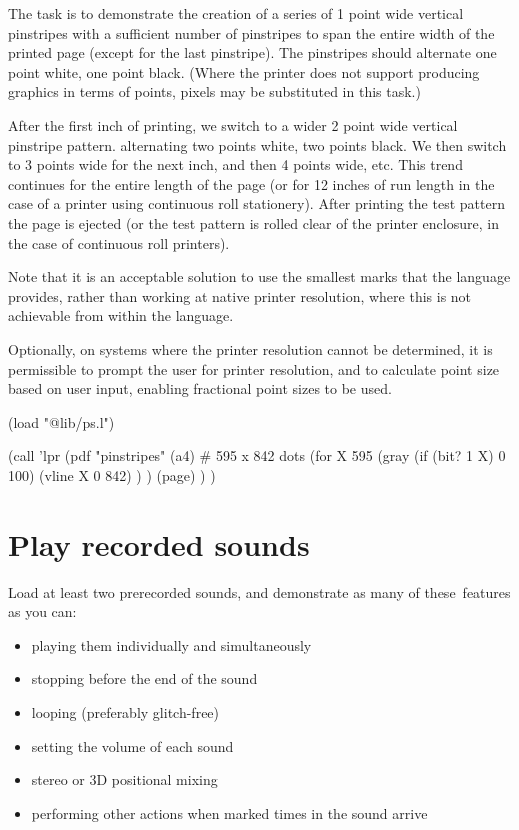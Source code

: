 The task is to demonstrate the creation of a series of 1 point wide
vertical pinstripes with a sufficient number of pinstripes to span the
entire width of the printed page (except for the last pinstripe). The
pinstripes should alternate one point white, one point black. (Where the
printer does not support producing graphics in terms of points, pixels
may be substituted in this task.)

After the first inch of printing, we switch to a wider 2 point wide
vertical pinstripe pattern. alternating two points white, two points
black. We then switch to 3 points wide for the next inch, and then 4
points wide, etc. This trend continues for the entire length of the page
(or for 12 inches of run length in the case of a printer using
continuous roll stationery). After printing the test pattern the page is
ejected (or the test pattern is rolled clear of the printer enclosure,
in the case of continuous roll printers).

Note that it is an acceptable solution to use the smallest marks that
the language provides, rather than working at native printer resolution,
where this is not achievable from within the language.

Optionally, on systems where the printer resolution cannot be
determined, it is permissible to prompt the user for printer resolution,
and to calculate point size based on user input, enabling fractional
point sizes to be used.


\begin{wideverbatim}

(load "@lib/ps.l")

(call 'lpr
   (pdf "pinstripes"
      (a4)  # 595 x 842 dots
      (for X 595
         (gray (if (bit? 1 X) 0 100)
            (vline X 0 842) ) )
      (page) ) )

\end{wideverbatim}

\pagebreak{}
\section*{Play recorded sounds}

Load at least two prerecorded sounds, and demonstrate as many of
these~features as you can:

\begin{itemize}
\item
  playing them individually and simultaneously
\item
  stopping before the end of the sound
\item
  looping (preferably glitch-free)
\item
  setting the volume of each sound
\item
  stereo or 3D positional mixing
\item
  performing other actions when marked times in the sound arrive
\end{itemize}

